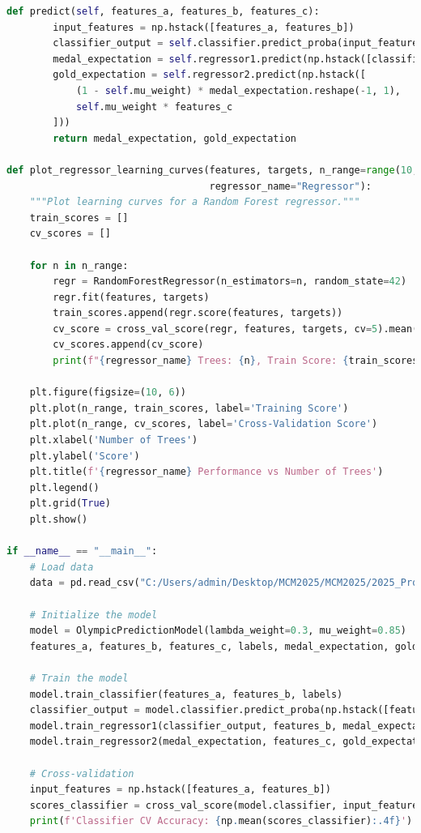 \documentclass[12pt]{article}
\begin{document}
\begin{lstlisting}[language=Python, style=mystyle, caption=model.ipynb]
    def predict(self, features_a, features_b, features_c):
        input_features = np.hstack([features_a, features_b])
        classifier_output = self.classifier.predict_proba(input_features)[:, 1]
        medal_expectation = self.regressor1.predict(np.hstack([classifier_output.reshape(-1, 1), features_b]))
        gold_expectation = self.regressor2.predict(np.hstack([
            (1 - self.mu_weight) * medal_expectation.reshape(-1, 1),
            self.mu_weight * features_c
        ]))
        return medal_expectation, gold_expectation

def plot_regressor_learning_curves(features, targets, n_range=range(10, 1000, 10), 
                                   regressor_name="Regressor"):
    """Plot learning curves for a Random Forest regressor."""
    train_scores = []
    cv_scores = [] 
    
    for n in n_range:
        regr = RandomForestRegressor(n_estimators=n, random_state=42)
        regr.fit(features, targets)
        train_scores.append(regr.score(features, targets))
        cv_score = cross_val_score(regr, features, targets, cv=5).mean()
        cv_scores.append(cv_score)
        print(f"{regressor_name} Trees: {n}, Train Score: {train_scores[-1]:.4f}, CV Score: {cv_scores[-1]:.4f}")
    
    plt.figure(figsize=(10, 6))
    plt.plot(n_range, train_scores, label='Training Score')
    plt.plot(n_range, cv_scores, label='Cross-Validation Score')
    plt.xlabel('Number of Trees')
    plt.ylabel('Score')
    plt.title(f'{regressor_name} Performance vs Number of Trees')
    plt.legend()
    plt.grid(True)
    plt.show()

if __name__ == "__main__":
    # Load data
    data = pd.read_csv("C:/Users/admin/Desktop/MCM2025/MCM2025/2025_Problem_C_Data/feature_Noc.csv")
    
    # Initialize the model
    model = OlympicPredictionModel(lambda_weight=0.3, mu_weight=0.85)
    features_a, features_b, features_c, labels, medal_expectation, gold_expectation = model.preprocess_data(data)
    
    # Train the model
    model.train_classifier(features_a, features_b, labels)
    classifier_output = model.classifier.predict_proba(np.hstack([features_a, features_b]))[:, 1]
    model.train_regressor1(classifier_output, features_b, medal_expectation)
    model.train_regressor2(medal_expectation, features_c, gold_expectation)
    
    # Cross-validation
    input_features = np.hstack([features_a, features_b])
    scores_classifier = cross_val_score(model.classifier, input_features, labels, cv=5)
    print(f'Classifier CV Accuracy: {np.mean(scores_classifier):.4f}')
    

\end{lstlisting}
\end{document}
